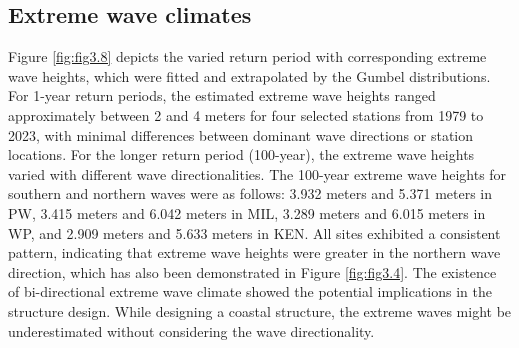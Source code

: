 \subsection{Extreme wave climates}
\label{c3_Extreme wave climates}

Figure \ref{fig:fig3.8} depicts the varied return period with corresponding
extreme wave heights, which were fitted and extrapolated by the Gumbel
distributions. For 1-year return periods, the estimated extreme wave heights
ranged approximately between 2 and 4 meters for four selected stations from 1979
to 2023, with minimal differences between dominant wave directions or station
locations. For the longer return period (100-year), the extreme wave heights
varied with different wave directionalities. The 100-year extreme wave heights
for southern and northern waves were as follows: 3.932 meters and 5.371 meters
in PW, 3.415 meters and 6.042 meters in MIL, 3.289 meters and 6.015 meters in
WP, and 2.909 meters and 5.633 meters in KEN. All sites exhibited a consistent
pattern, indicating that extreme wave heights were greater in the northern wave
direction, which has also been demonstrated in Figure \ref{fig:fig3.4}. The
existence of bi-directional extreme wave climate showed the potential
implications in the structure design. While designing a coastal structure, the
extreme waves might be underestimated without considering the wave
directionality.

